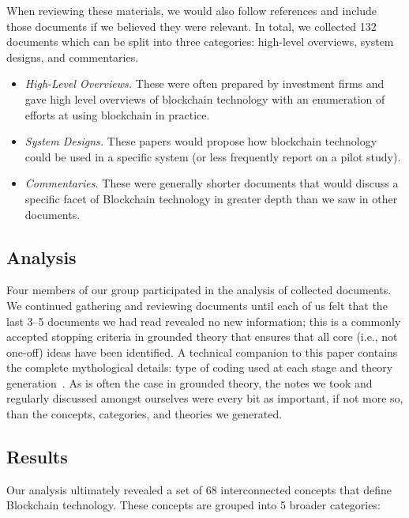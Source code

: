 When reviewing these materials, we would also follow references and include those documents if we believed they were relevant. In total, we collected 132 documents which can be split into three categories: high-level overviews, system designs, and commentaries.

\begin{itemize}
	\item \emph{High-Level Overviews.} These were often prepared by investment firms and gave high level overviews of blockchain technology with an enumeration of efforts at using blockchain in practice.
	\item \emph{System Designs.} These papers would propose how blockchain technology could be used in a specific system (or less frequently report on a pilot study).
	\item \emph{Commentaries.} These were generally shorter documents that would discuss a specific facet of Blockchain technology in greater depth than we saw in other documents.
\end{itemize}

\subsection{Analysis}

Four members of our group participated in the analysis of collected documents.
We continued gathering and reviewing documents until each of us felt that the last 3--5 documents we had read revealed no new information; this is a commonly accepted stopping criteria in grounded theory that ensures that all core (i.e., not one-off) ideas have been identified. A technical companion to this paper contains the complete mythological details: type of coding used at each stage and theory generation~\cite{RKYCC19}. As is often the case in grounded theory, the notes we took and regularly discussed amongst ourselves were every bit as important, if not more so, than the concepts, categories, and theories we generated.

\subsection{Results}

Our analysis ultimately revealed a set of 68 interconnected concepts that define Blockchain technology. These concepts are grouped into 5 broader categories:

